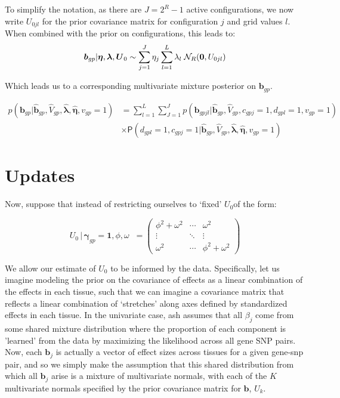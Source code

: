 \documentclass[10pt]{article}
\newcommand{\Prd}{\mathsf{P}} %
\newcommand{\Norm}{{\mathcal{N}}} %
\newcommand{\Uv}{\mbox{\boldmath$U$}}
\begin{document}
To simplify the notation, as there are $J=2^R-1$ active configurations, we now write $U_{0jl}$ for the prior covariance matrix for configuration $j$ and grid values $l$.
When combined with the prior on configurations, this leads to:
\begin{equation}
  \label{prior_b_mixt_grid_config}
  \bm{b}_{gp} | \bm{\eta},\bm{\lambda},\Uv_0 \sim \sum_{j=1}^J \eta_j \sum_{l=1}^L \lambda_l \; \Norm_R(\bm{0}, U_{0jl})
\end{equation}

Which leads us to a corresponding multivariate mixture posterior on $\bm{b}_{gp}$. 


\begin{equation}
\begin{aligned}
  \label{post_b_j_init}
p(\bm{b}_{gp} | \hat{\bm{b}}_{gp}, \hat{V}_{gp}, \hat{\bm{\lambda}}, \hat{\bm{\eta}}, v_{gp}=1) &= \sum_{l=1}^L \sum_{J=1}^J p(\bm{b}_{gpjl} | \hat{\bm{b}}_{gp}, \hat{V}_{gp}, c_{gpj}=1, d_{gpl}=1,v_{gp}=1) \\
&\times \Prd(d_{gpl}=1,c_{gpj}=1 | \hat{\bm{b}}_{gp}, \hat{V}_{gp}, \hat{\bm{\lambda} },\hat{\bm{\eta}},v_{gp}=1) 
\end{aligned}
\end{equation}

\section{Updates}

Now, suppose that instead of restricting ourselves to `fixed' $U_{0} $of the form: 

\begin{equation}
  U_{0} \, | \, \bm{\gamma}_{gp} = \bm{1}, \phi, \omega \; \; =
  \begin{pmatrix}
    \phi^2 + \omega^2 & \cdots & \omega^2 \\
    \vdots & \ddots & \vdots \\
    \omega^2 & \cdots & \phi^2 + \omega^2
  \end{pmatrix}
\end{equation}

We allow our estimate of $U_{0}$ to be informed by the data. Specifically, let us imagine modeling the prior on the covariance of effects as a linear combination of the effects in each tissue, such that we can imagine a covariance matrix that reflects a linear combination of `stretches' along axes defined by standardized effects in each tissue.  In the univariate case, ash assumes that all $\beta_{j}$ come from some shared mixture distribution where the proportion of each component is 'learned' from the data by maximizing the likelihood across all gene SNP pairs. Now, each $\bm{b}_{j}$ is actually a vector of effect sizes across tissues for a given gene-snp pair, and so we simply make the assumption that this shared distribution from which all $\bm{b}_{j}$ arise is a mixture of multivariate normals, with each of the $K$ multivariate normals specified by the prior covariance matrix for $\bm{b}$, $U_{k}$.
\end{document}
